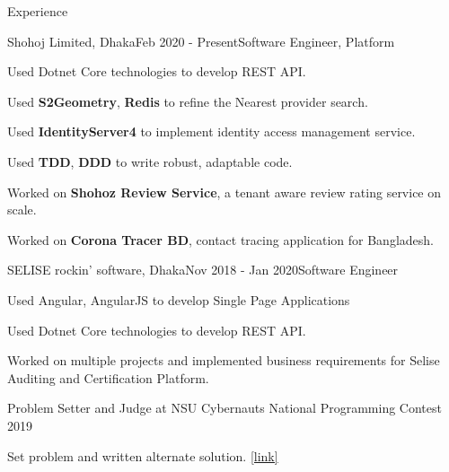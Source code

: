 \documentclass{resume}
\begin{document}
\begin{rSection}{Experience}

\begin{rSubsection}{Shohoj Limited, Dhaka}{Feb 2020 - Present}{Software Engineer, Platform}{}

\item Used Dotnet Core technologies to develop REST API.
\item Used \textbf{S2Geometry}, \textbf{Redis} to refine the Nearest provider search.
\item Used \textbf{IdentityServer4} to implement identity access management service.
\item Used \textbf{TDD}, \textbf{DDD} to write robust, adaptable code.
\item Worked on \textbf{Shohoz Review Service}, a tenant aware review rating service on scale.
\item Worked on \textbf{Corona Tracer BD}, contact tracing application for Bangladesh.
\end{rSubsection}

\begin{rSubsection}{SELISE rockin' software, Dhaka}{Nov 2018 - Jan 2020}{Software Engineer}{}
\item Used Angular, AngularJS to develop Single Page Applications
\item Used Dotnet Core technologies to develop REST API.
\item  Worked on multiple projects and implemented business requirements for Selise Auditing and Certification Platform.
\end{rSubsection}

\begin{rSubsection}{Problem Setter and Judge at NSU Cybernauts National Programming Contest 2019}{}{}{}
\item Set problem and written alternate solution. \href{https://toph.co/c/cybernauts19}{[link]}
\end{rSubsection}

\end{rSection}

\end{document}
